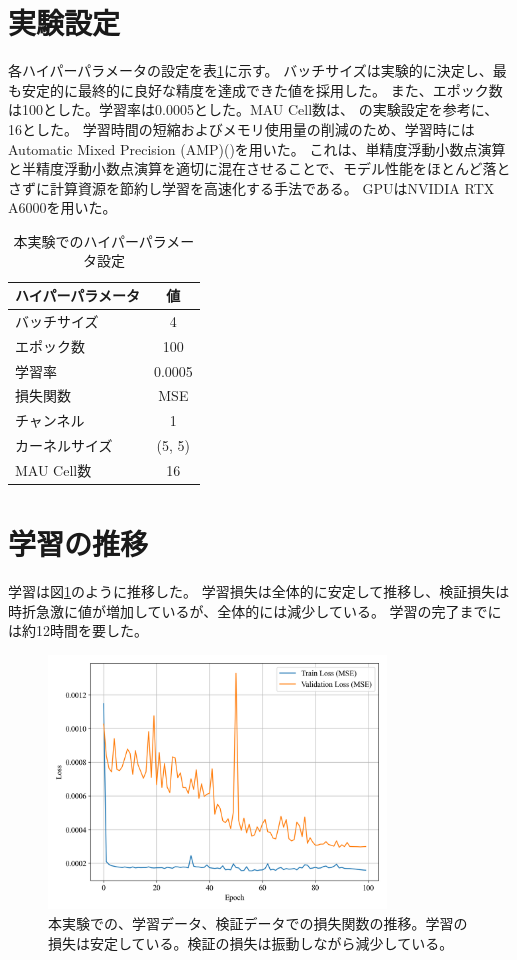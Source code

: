   \section{実験設定}
    各ハイパーパラメータの設定を表\ref{tab:exp1_hyperparameters}に示す。
    バッチサイズは実験的に決定し、最も安定的に最終的に良好な精度を達成できた値を採用した。
    また、エポック数は100とした。学習率は0.0005とした。MAU Cell数は、 \cite{chang2021mau} の実験設定を参考に、16とした。
    学習時間の短縮およびメモリ使用量の削減のため、学習時にはAutomatic Mixed Precision (AMP)(\cite{micikevicius2017mixed})を用いた。
    これは、単精度浮動小数点演算と半精度浮動小数点演算を適切に混在させることで、モデル性能をほとんど落とさずに計算資源を節約し学習を高速化する手法である。
    GPUはNVIDIA RTX A6000を用いた。
    \begin{table}[htbp]
      \centering
      \begin{tabular}{lc}
      \hline
      ハイパーパラメータ & 値 \\
      \hline\hline
      バッチサイズ & 4 \\
      \hline
      エポック数 & 100 \\
      \hline
      学習率 & 0.0005 \\
      \hline
      損失関数 & MSE \\
      \hline
      チャンネル & 1 \\
      \hline
      カーネルサイズ & (5, 5) \\
      \hline
      MAU Cell数 & 16 \\
      \hline
      \end{tabular}
      \caption{本実験でのハイパーパラメータ設定}
      \label{tab:exp1_hyperparameters}
    \end{table}

  \section{学習の推移}
  学習は図\ref{fig:exp1_learn_progress}のように推移した。
  学習損失は全体的に安定して推移し、検証損失は時折急激に値が増加しているが、全体的には減少している。
  学習の完了までには約12時間を要した。
  \begin{figure}[htbp]
    \centering
    \includegraphics[width=0.8\textwidth]{figures/exp1/loss.png}
    \caption{本実験での、学習データ、検証データでの損失関数の推移。学習の損失は安定している。検証の損失は振動しながら減少している。}
    \label{fig:exp1_learn_progress}
  \end{figure}

